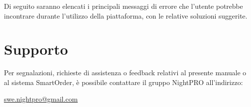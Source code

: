 \documentclass[a4paper, 11pt, oneside]{scrartcl}
\begin{document}
Di seguito saranno elencati i principali messaggi di errore che l'utente potrebbe incontrare durante l'utilizzo della piattaforma, con le relative soluzioni suggerite.


\newpage
\section{Supporto}
Per segnalazioni, richieste di assistenza o feedback relativi al presente manuale o al sistema SmartOrder, \`e possibile contattare il gruppo NightPRO all'indirizzo:

\begin{center}
    \large \href{mailto:swe.nightpro@gmail.com}{swe.nightpro@gmail.com}
\end{center}
\end{document}

